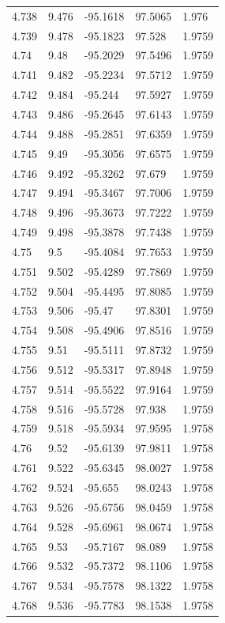 \begin{tabular}{lllll}
4.738 & 9.476 & -95.1618 & 97.5065 & 1.976 \\
4.739 & 9.478 & -95.1823 & 97.528 & 1.9759 \\
4.74 & 9.48 & -95.2029 & 97.5496 & 1.9759 \\
4.741 & 9.482 & -95.2234 & 97.5712 & 1.9759 \\
4.742 & 9.484 & -95.244 & 97.5927 & 1.9759 \\
4.743 & 9.486 & -95.2645 & 97.6143 & 1.9759 \\
4.744 & 9.488 & -95.2851 & 97.6359 & 1.9759 \\
4.745 & 9.49 & -95.3056 & 97.6575 & 1.9759 \\
4.746 & 9.492 & -95.3262 & 97.679 & 1.9759 \\
4.747 & 9.494 & -95.3467 & 97.7006 & 1.9759 \\
4.748 & 9.496 & -95.3673 & 97.7222 & 1.9759 \\
4.749 & 9.498 & -95.3878 & 97.7438 & 1.9759 \\
4.75 & 9.5 & -95.4084 & 97.7653 & 1.9759 \\
4.751 & 9.502 & -95.4289 & 97.7869 & 1.9759 \\
4.752 & 9.504 & -95.4495 & 97.8085 & 1.9759 \\
4.753 & 9.506 & -95.47 & 97.8301 & 1.9759 \\
4.754 & 9.508 & -95.4906 & 97.8516 & 1.9759 \\
4.755 & 9.51 & -95.5111 & 97.8732 & 1.9759 \\
4.756 & 9.512 & -95.5317 & 97.8948 & 1.9759 \\
4.757 & 9.514 & -95.5522 & 97.9164 & 1.9759 \\
4.758 & 9.516 & -95.5728 & 97.938 & 1.9759 \\
4.759 & 9.518 & -95.5934 & 97.9595 & 1.9758 \\
4.76 & 9.52 & -95.6139 & 97.9811 & 1.9758 \\
4.761 & 9.522 & -95.6345 & 98.0027 & 1.9758 \\
4.762 & 9.524 & -95.655 & 98.0243 & 1.9758 \\
4.763 & 9.526 & -95.6756 & 98.0459 & 1.9758 \\
4.764 & 9.528 & -95.6961 & 98.0674 & 1.9758 \\
4.765 & 9.53 & -95.7167 & 98.089 & 1.9758 \\
4.766 & 9.532 & -95.7372 & 98.1106 & 1.9758 \\
4.767 & 9.534 & -95.7578 & 98.1322 & 1.9758 \\
4.768 & 9.536 & -95.7783 & 98.1538 & 1.9758 \\

\end{tabular}
